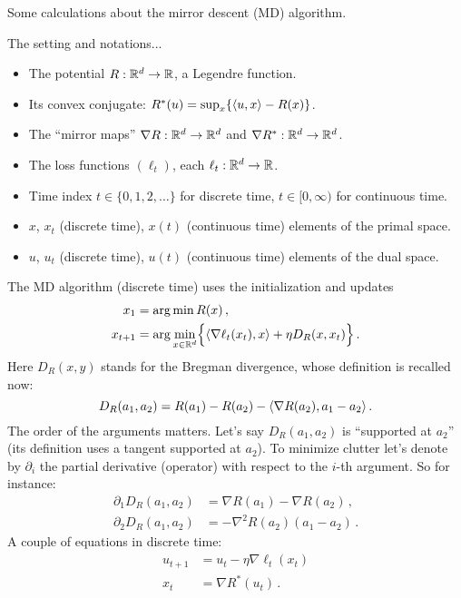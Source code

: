 \documentclass[12pt]{report}
\theoremstyle{plain}
\theoremstyle{definition}
\theoremstyle{remark}
\begin{document}

Some calculations about the mirror descent (MD) algorithm.

\bigskip

\noindent
The setting and notations...
\begin{itemize}[leftmargin=*, itemsep=2pt]
\item The potential $R : \mathbb{R}^d \to \mathbb{R}$, a Legendre function.
\item Its convex conjugate: $R^{*}(u) = \sup_{x} \{ \langle {u,x}\rangle - R(x)\}$.
\item The ``mirror maps'' $\nabla R : \mathbb{R}^d \to \mathbb{R}^d$ and $\nabla R^{*} : \mathbb{R}^d \to \mathbb{R}^d$.
\item The loss functions $(\ell_t)$, each $\ell_t : \mathbb{R}^d \to \mathbb{R}$.
\item Time index $t \in \{ 0,1,2,\ldots \}$ for discrete time, $t \in [0,\infty)$ for continuous time.
\item $x$, $x_t$ (discrete time), $x(t)$ (continuous time) elements of the primal space.
\item $u$, $u_t$ (discrete time), $u(t)$ (continuous time) elements of the dual space.
\end{itemize}
The MD algorithm (discrete time) uses the initialization and updates
\begin{align*}
x_1 &= \arg\min R(x)\,, \\
x_{t+1} &= \arg\min_{x \in \mathbb{R}^d} \Bigl\{ \langle {\nabla\ell_t(x_{t}), x}\rangle + \eta D_{R}(x, x_{t})\Bigr\}\,.
\end{align*}
Here $D_{R}(x,y)$ stands for the Bregman divergence, whose definition is recalled now:
$$
D_{R}(a_{1}, a_{2}) = R(a_{1}) - R(a_{2}) - \langle {\nabla R(a_2), a_{1} - a_{2}}\rangle\,.
$$
The order of the arguments matters.
Let's say $D_{R}(a_{1},a_{2})$ is ``supported at $a_{2}$'' 
(its definition uses a tangent supported at $a_{2}$).
To minimize clutter let's denote by $\partial_{i}$ the partial derivative (operator)
with respect to the $i$-th argument. So for instance:
\begin{align*}
\partial_{1} D_{R}(a_{1}, a_{2}) &= \nabla R(a_{1}) - \nabla R(a_{2})\,, \\[1mm]
\partial_{2} D_{R}(a_{1}, a_{2}) &= - \nabla^2 R(a_{2})(a_{1} - a_{2})\,.
\end{align*}
A couple of equations in discrete time:
\begin{align*}
u_{t+1} &= u_{t} - \eta \nabla \ell_{t}(x_{t}) \label{eq.dtime.1} \tag{1dt} \\
x_{t} &= \nabla R^{*}(u_{t})\,. \label{eq.dtime.2} \tag{2dt}
\end{align*}
\end{document}
